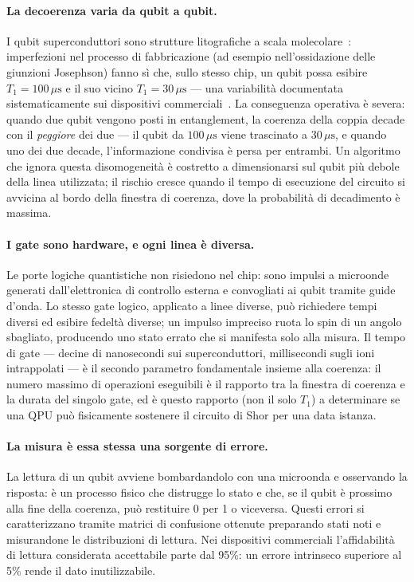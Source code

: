 \begin{onehalfspace}
\paragraph{La decoerenza varia da qubit a qubit.}
I qubit superconduttori sono strutture litografiche a scala molecolare~\cite{koch2007}: imperfezioni nel processo di fabbricazione (ad esempio nell'ossidazione delle giunzioni Josephson) fanno sì che, sullo stesso chip, un qubit possa esibire $T_1 = 100\,\mu\text{s}$ e il suo vicino $T_1 = 30\,\mu\text{s}$ --- una variabilità documentata sistematicamente sui dispositivi commerciali~\cite{tannu2019}. La conseguenza operativa è severa: quando due qubit vengono posti in entanglement, la coerenza della coppia decade con il \emph{peggiore} dei due --- il qubit da $100\,\mu\text{s}$ viene trascinato a $30\,\mu\text{s}$, e quando uno dei due decade, l'informazione condivisa è persa per entrambi. Un algoritmo che ignora questa disomogeneità è costretto a dimensionarsi sul qubit più debole della linea utilizzata; il rischio cresce quando il tempo di esecuzione del circuito si avvicina al bordo della finestra di coerenza, dove la probabilità di decadimento è massima.

\paragraph{I gate sono hardware, e ogni linea è diversa.}
Le porte logiche quantistiche non risiedono nel chip: sono impulsi a microonde generati dall'elettronica di controllo esterna e convogliati ai qubit tramite guide d'onda. Lo stesso gate logico, applicato a linee diverse, può richiedere tempi diversi ed esibire fedeltà diverse; un impulso impreciso ruota lo spin di un angolo sbagliato, producendo uno stato errato che si manifesta solo alla misura. Il tempo di gate --- decine di nanosecondi sui superconduttori, millisecondi sugli ioni intrappolati --- è il secondo parametro fondamentale insieme alla coerenza: il numero massimo di operazioni eseguibili è il rapporto tra la finestra di coerenza e la durata del singolo gate, ed è questo rapporto (non il solo $T_1$) a determinare se una \ac{QPU} può fisicamente sostenere il circuito di Shor per una data istanza.

\paragraph{La misura è essa stessa una sorgente di errore.}
La lettura di un qubit avviene bombardandolo con una microonda e osservando la risposta: è un processo fisico che distrugge lo stato e che, se il qubit è prossimo alla fine della coerenza, può restituire 0 per 1 o viceversa. Questi errori si caratterizzano tramite matrici di confusione ottenute preparando stati noti e misurandone le distribuzioni di lettura. Nei dispositivi commerciali l'affidabilità di lettura considerata accettabile parte dal 95\%: un errore intrinseco superiore al 5\% rende il dato inutilizzabile.


\end{onehalfspace}

